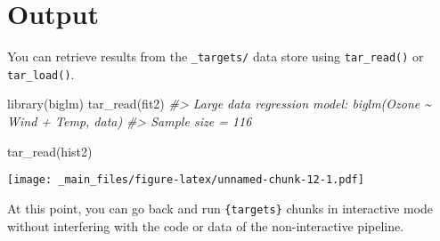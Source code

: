 \documentclass[
]{book}
\newenvironment{Shaded}{\begin{snugshade}}{\end{snugshade}}
\newcommand{\CommentTok}[1]{\textcolor[rgb]{0.56,0.35,0.01}{\textit{#1}}}
\newcommand{\FunctionTok}[1]{\textcolor[rgb]{0.00,0.00,0.00}{#1}}
\newcommand{\NormalTok}[1]{#1}
\begin{document}
\hypertarget{output-1}{%
\section{Output}\label{output-1}}

You can retrieve results from the \texttt{\_targets/} data store using \texttt{tar\_read()} or \texttt{tar\_load()}.

\begin{Shaded}
\begin{Highlighting}[]
\FunctionTok{library}\NormalTok{(biglm)}
\FunctionTok{tar\_read}\NormalTok{(fit2)}
\CommentTok{\#\textgreater{} Large data regression model: biglm(Ozone \textasciitilde{} Wind + Temp, data)}
\CommentTok{\#\textgreater{} Sample size =  116}
\end{Highlighting}
\end{Shaded}

\begin{Shaded}
\begin{Highlighting}[]
\FunctionTok{tar\_read}\NormalTok{(hist2)}
\end{Highlighting}
\end{Shaded}

\texttt{[image: \_main\_files/figure-latex/unnamed-chunk-12-1.pdf]}

At this point, you can go back and run \texttt{\{targets\}} chunks in interactive mode without interfering with the code or data of the non-interactive pipeline.

  
\end{document}
